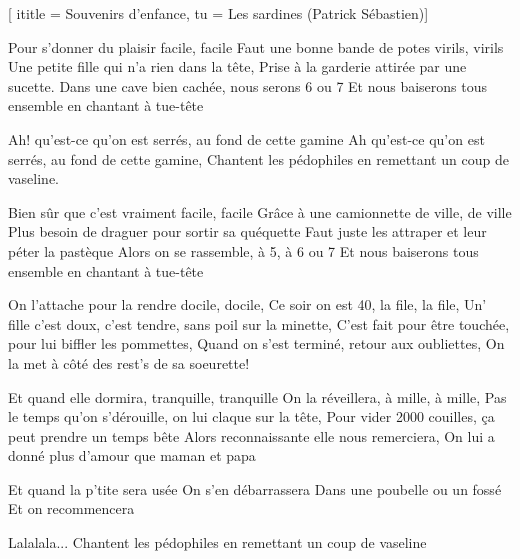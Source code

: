 [
ititle = {Souvenirs d'enfance},
tu = {Les sardines (Patrick Sébastien)}]


\beginverse
Pour s'donner du plaisir facile, facile
Faut une bonne bande de potes virils, virils
Une petite fille qui n'a rien dans la tête,
Prise à la garderie attirée par une sucette.
Dans une cave bien cachée, nous serons 6 ou 7
Et nous baiserons tous ensemble en chantant à tue-tête
\endverse

\beginchorus
Ah! qu'est-ce qu'on est serrés, au fond de cette gamine
Ah qu'est-ce qu'on est serrés, au fond de cette gamine,
Chantent les pédophiles en remettant un coup de vaseline.
\endchorus

\beginverse
Bien sûr que c'est vraiment facile, facile
Grâce à une camionnette de ville, de ville
Plus besoin de draguer pour sortir sa quéquette
Faut juste les attraper et leur péter la pastèque
Alors on se rassemble, à 5, à 6 ou 7
Et nous baiserons tous ensemble en chantant à tue-tête
\endverse

\beginverse
On l'attache pour la rendre docile, docile,
Ce soir on est 40, la file, la file,
Un' fille c'est doux, c'est tendre, sans poil sur la minette,
C'est fait pour être touchée, pour lui biffler les pommettes,
Quand on s'est terminé, retour aux oubliettes,
On la met à côté des rest's de sa soeurette!
\endverse

\beginverse
Et quand elle dormira, tranquille, tranquille
On la réveillera, à mille, à mille,
Pas le temps qu'on s'dérouille, on lui claque sur la tête,
Pour vider 2000 couilles, ça peut prendre un temps bête
Alors reconnaissante elle nous remerciera,
On lui a donné plus d'amour que maman et papa
\endverse

\begincverse
Et quand la p'tite sera usée
On s'en débarrassera
Dans une poubelle ou un fossé
Et on recommencera
\endverse

\beginchorus
Lalalala...
Chantent les pédophiles en remettant un coup de vaseline
\endchorus

\endsong